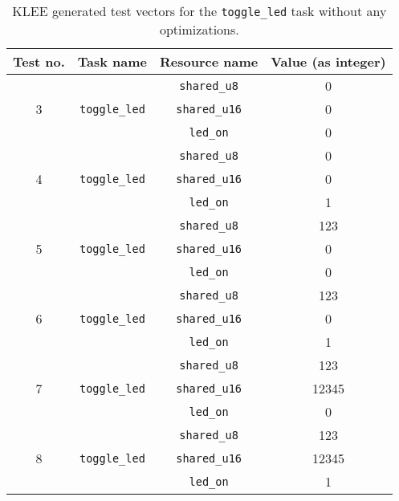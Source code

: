 \begin{table}[H]
    \centering
    \begin{longtable}{|c|c|c|c|}
    \hline
    Test no. & Task name & Resource name & Value (as integer) \\ \hline
    \multirow{3}{*}{3} & \multirow{3}{*}{\texttt{toggle\_led}} & \texttt{shared\_u8}  & 0 \\ \cline{3-4} 
                       &                                       & \texttt{shared\_u16} & 0 \\ \cline{3-4} 
                       &                                       & \texttt{led\_on}     & 0 \\ \hline
    \multirow{3}{*}{4} & \multirow{3}{*}{\texttt{toggle\_led}} & \texttt{shared\_u8}  & 0 \\ \cline{3-4} 
                       &                                       & \texttt{shared\_u16} & 0 \\ \cline{3-4} 
                       &                                       & \texttt{led\_on}     & 1 \\ \hline
    \multirow{3}{*}{5} & \multirow{3}{*}{\texttt{toggle\_led}} & \texttt{shared\_u8}  & 123 \\ \cline{3-4} 
                       &                                       & \texttt{shared\_u16} & 0 \\ \cline{3-4} 
                       &                                       & \texttt{led\_on}     & 0 \\ \hline
    \multirow{3}{*}{6} & \multirow{3}{*}{\texttt{toggle\_led}} & \texttt{shared\_u8}  & 123 \\ \cline{3-4} 
                       &                                       & \texttt{shared\_u16} & 0 \\ \cline{3-4} 
                       &                                       & \texttt{led\_on}     & 1 \\ \hline
    \multirow{3}{*}{7} & \multirow{3}{*}{\texttt{toggle\_led}} & \texttt{shared\_u8}  & 123 \\ \cline{3-4} 
                       &                                       & \texttt{shared\_u16} & 12345 \\ \cline{3-4} 
                       &                                       & \texttt{led\_on}     & 0 \\ \hline
    \multirow{3}{*}{8} & \multirow{3}{*}{\texttt{toggle\_led}} & \texttt{shared\_u8}  & 123 \\ \cline{3-4} 
                       &                                       & \texttt{shared\_u16} & 12345 \\ \cline{3-4} 
                       &                                       & \texttt{led\_on}      & 1 \\ \hline
    \end{longtable}
    \caption{KLEE generated test vectors for the \texttt{toggle\_led} task without any optimizations.}
    \label{tab:evaldebugteststoggle}
\end{table}

